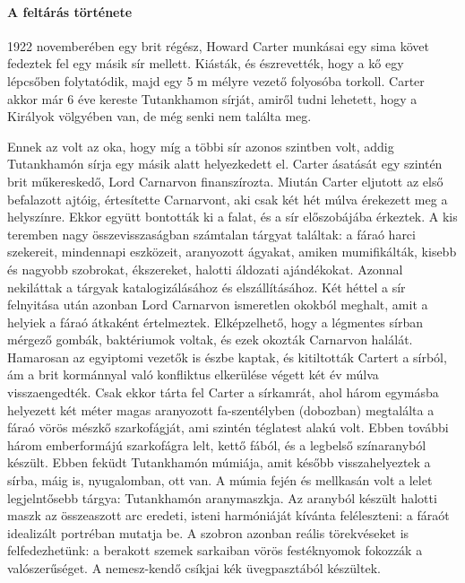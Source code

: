 \paragraph{A feltárás története}
1922 novemberében egy brit régész, Howard Carter munkásai egy sima követ fedeztek fel egy másik sír mellett. Kiásták, és észrevették, hogy a kő egy lépcsőben folytatódik, majd egy 5 m mélyre vezető folyosóba torkoll. Carter akkor már 6 éve kereste Tutankhamon sírját, amiről tudni lehetett, hogy a Királyok völgyében van, de még senki nem találta meg. 


\begin{figure}
\end{figure}

Ennek az volt az oka, hogy míg a többi sír azonos szintben volt, addig Tutankhamón sírja egy másik alatt helyezkedett el. Carter ásatását egy szintén brit műkereskedő, Lord Carnarvon finanszírozta. Miután Carter eljutott az első befalazott ajtóig, értesítette Carnarvont, aki csak két hét múlva érekezett meg a helyszínre. Ekkor együtt bontották ki a falat, és a sír előszobájába érkeztek. A kis teremben nagy összevisszaságban számtalan tárgyat találtak: a fáraó harci szekereit, mindennapi eszközeit, aranyozott ágyakat, amiken mumifikálták, kisebb és nagyobb szobrokat, ékszereket, halotti áldozati ajándékokat. Azonnal nekiláttak a tárgyak katalogizálásához és elszállításához. Két héttel a sír felnyitása után azonban Lord Carnarvon ismeretlen okokból meghalt, amit a helyiek a fáraó átkaként értelmeztek. Elképzelhető, hogy a légmentes sírban mérgező gombák, baktériumok voltak, és ezek okozták Carnarvon halálát. Hamarosan az egyiptomi vezetők is észbe kaptak, és kitiltották Cartert a sírból, ám a brit kormánnyal való konfliktus elkerülése végett két év múlva visszaengedték. Csak ekkor tárta fel Carter a sírkamrát, ahol három egymásba helyezett két méter magas aranyozott fa-szentélyben (dobozban) megtalálta a fáraó vörös mészkő szarkofágját, ami szintén téglatest alakú volt. Ebben további három emberformájú szarkofágra lelt, kettő fából, és a legbelső színaranyból készült. Ebben feküdt Tutankhamón múmiája, amit később visszahelyeztek a sírba, máig is, nyugalomban, ott van. A múmia fején és mellkasán volt a lelet legjelntősebb tárgya: Tutankhamón aranymaszkja. Az aranyból készült halotti maszk az összeaszott arc eredeti, isteni harmóniáját kívánta feléleszteni: a fáraót idealizált portréban mutatja be. A szobron azonban reális törekvéseket is felfedezhetünk: a berakott szemek sarkaiban vörös festéknyomok fokozzák a valószerűséget. A nemesz-kendő csíkjai kék üvegpasztából készültek.

